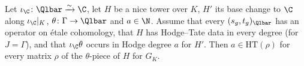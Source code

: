 \begin{proposition}\label{pf:steps1:loce}
Let $\iota_{\C}\colon\Qlbar\xrightarrow\sim\C$, let $H$ be a nice tower over $K$, $H'$ its base change to $\C$
along $\iota_{\C}|_K$, $\theta\colon\Gamma\to\Qlbar$ and $a\in\N$. Assume that every $(s_g,t_g)_{\Qlbar}$ has an
operator on \'etale cohomology, that $H$ has Hodge--Tate data in every degree (for $J=\Gamma$), and that
$\iota_{\C}\theta$ occurs in Hodge degree $a$ for $H'$. Then $a\in\mathrm{HT}(\rho)$ for every matrix $\rho$ of the
$\theta$-piece of $H$ for $G_K$.
\end{proposition}

